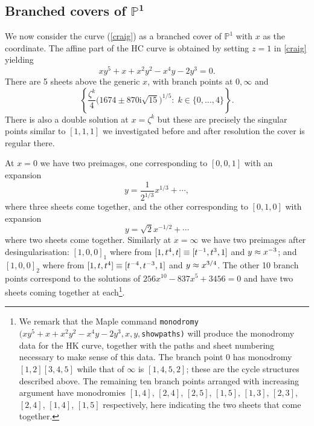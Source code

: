 \documentclass[pdftex]{sigma}
\numberwithin{equation}{section}
\newcommand{\mi}{\mathrm{i}}
\begin{document}
\subsection[Branched covers of $\mathbb{P}^1$]{Branched covers of $\boldsymbol{\mathbb{P}^1}$}\label{section3.2}

We now consider the curve (\ref{craig}) as a branched cover of $\mathbb{P}^1$
with $x$ as the coordinate. The af\/f\/ine part of the HC curve is obtained by setting $z=1$
in \eqref{craig} yielding
\begin{equation}
  \label{craigp1}
  x y^5 + x + x^2 y^2 - x^4 y - 2 y^3 = 0.
\end{equation}
There are 5 sheets above the generic $x$, with branch points at $0,
\infty$ and
\[
  \left\{ \frac{\zeta^k}{4}
    \big(1674\pm 870\mi\sqrt{15}\big)^{1/5}
    : \;  k \in \{0,\dots,4\}
  \right\}.
\]
There is also a double solution at $x=\zeta^k$ but these are
precisely the singular points similar to $[1,1,1]$ we investigated
before and after resolution the cover is regular there.

At $x=0$ we have two preimages, one corresponding to $[0,0,1]$ with an
expansion
\begin{equation}
  \label{eq:x0exp1}
  y = \frac{1}{2^{1/3}} x^{1/3} + \cdots,
\end{equation}
where three sheets come together, and the other corresponding to $[0,1,0]$ with expansion
\begin{equation}
  \label{eq:x0exp2}
  y = \sqrt{2} x^{-1/2} + \cdots
\end{equation}
where two sheets come together.
Similarly at $x=\infty$ we have two preimages after
desingularisation: $[1,0,0]_1$ where from $[1,t^4,t]\equiv [t\sp{-1},t\sp{3},1]$ and
$y\approx x\sp{-3}$; and $[1,0,0]_2$ where from $[1,t,t^4]\equiv [t\sp{-4},t\sp{-3},1]$ and
$y\approx x\sp{3/4}$.
The other 10 branch
points correspond to the solutions of $256 x^{10}-837 x^5+3456=0$ and have two sheets
coming together at each\footnote{We remark that the Maple command {\tt{monodromy}$(x y^5 + x + x^2 y^2 - x^4 y - 2 y^3,x,y,$\tt{showpaths})} will produce the monodromy data for the HK curve, together with the paths and sheet numbering
necessary to make sense of this data. The branch point $0$ has monodromy $[1,2][3,4,5]$ while that of $\infty$ is $[1,4,5,2]$; these are the cycle structures described above. The remaining ten branch points arranged with increasing argument have monodromies $[1,4]$, $[2,4]$, $[2,5]$, $[1,5]$, $[1,3]$, $[2,3]$,$[2,4]$, $[1,4]$, $[1,5]$ respectively,
here indicating the two sheets that come together.}.
\end{document}
